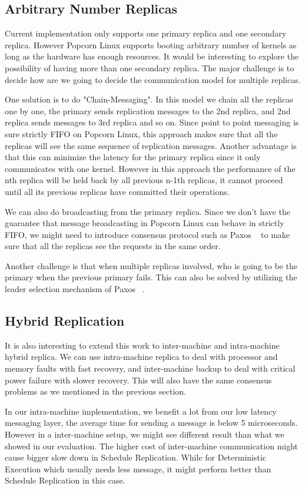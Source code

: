 \subsection{Arbitrary Number Replicas}
Current implementation only supports one primary replica and one secondary replica. However Popcorn Linux supports booting arbitrary number of kernels as long as the hardware has enough resources. It would be interesting to explore the possibility of having more than one secondary replica. The major challenge is to decide how are we going to decide the communication model for multiple replicas.

One solution is to do "Chain-Messaging". In this model we chain all the replicas one by one, the primary sends replication messages to the 2nd replica, and 2nd replica sends messages to 3rd replica and so on. Since point to point messaging is sure strictly FIFO on Popcorn Linux, this approach makes sure that all the replicas will see the same sequence of replication messages. Another advantage is that this can minimize the latency for the primary replica since it only communicates with one kernel. However in this approach the performance of the nth replica will be held back by all previous n-1th replicas, it cannot proceed until all its previous replicas have committed their operations.

We can also do broadcasting from the primary replica. Since we don't have the guarantee that message broadcasting in Popcorn Linux can behave in strictly FIFO, we might need to introduce consensus protocol such as Paxos ~\cite{lamport2001paxos} to make sure that all the replicas see the requests in the same order.

Another challenge is that when multiple replicas involved, who is going to be the primary when the previous primary fails. This can also be solved by utilizing the leader selection mechanism of Paxos ~\cite{lamport2001paxos}.

\subsection{Hybrid Replication}

It is also interesting to extend this work to inter-machine and intra-machine hybrid replica. We can use intra-machine replica to deal with processor and memory faults with fast recovery, and inter-machine backup to deal with critical power failure with slower recovery. This will also have the same consensus problems as we mentioned in the previous section.

In our intra-machine implementation, we benefit a lot from our low latency messaging layer, the average time for sending a message is below 5 microseconds. However in a inter-machine setup, we might see different result than what we showed in our evaluation. The higher cost of inter-machine communication might cause bigger slow down in Schedule Replication. While for Deterministic Execution which usually needs less message, it might perform better than Schedule Replication in this case.